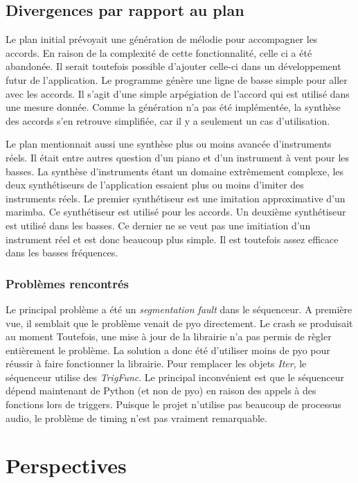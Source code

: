 \documentclass[letterpaper,12pt]{scrartcl}
\begin{document}
	\subsection{Divergences par rapport au plan}
	Le plan initial prévoyait une génération de mélodie pour accompagner les accords. En raison de la complexité de cette fonctionnalité, celle ci a été abandonée. Il serait toutefois possible d'ajouter celle-ci dans un développement futur de l'application. Le programme génère une ligne de basse simple pour aller avec les accords. Il s'agit d'une simple arpégiation de l'accord qui est utilisé dans une mesure donnée. Comme la génération n'a pas été implémentée, la synthèse des accords s'en retrouve simplifiée, car il y a seulement un cas d'utilisation.
	
	Le plan mentionnait aussi une synthèse plus ou moins avancée d'instruments réels. Il était entre autres question d'un piano et d'un instrument à vent pour les basses. La synthèse d'instruments étant un domaine extrêmement complexe, les deux synthétiseurs de l'application essaient plus ou moins d'imiter des instruments réels. Le premier synthétiseur est une imitation approximative d'un marimba. Ce synthétiseur est utilisé pour les accords. Un deuxième synthétiseur est utilisé dans les basses. Ce dernier ne se veut pas une imitiation d'un instrument réel et est donc beaucoup plus simple. Il est toutefois assez efficace dans les basses fréquences.


	\subsubsection{Problèmes rencontrés}
	Le principal problème a été un \textit{segmentation fault} dans le séquenceur. A première vue, il semblait que le problème venait de pyo directement. Le crash se produisait au moment  Toutefois, une mise à jour de la librairie n'a pas permis de règler entièrement le problème. La solution a donc été d'utiliser moins de pyo pour réussir à faire fonctionner la librairie. Pour remplacer les objets \textit{Iter}, le séquenceur utilise des \textit{TrigFunc}. Le principal inconvénient est que le séquenceur dépend maintenant de Python (et non de pyo) en raison des appels à des fonctions lors de triggers. Puisque le projet n'utilise pas beaucoup de processus audio, le problème de timing n'est pas vraiment remarquable.

	\section{Perspectives}
\end{document}
